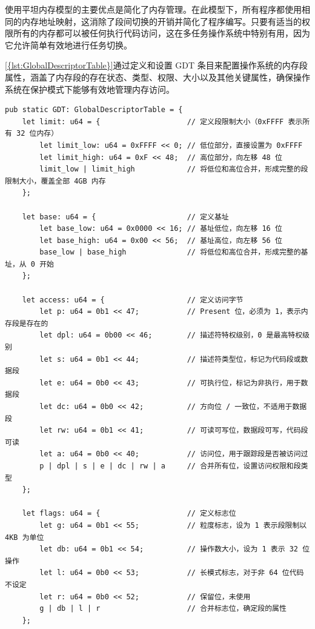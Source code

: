 使用平坦内存模型的主要优点是简化了内存管理。在此模型下，所有程序都使用相同的内存地址映射，这消除了段间切换的开销并简化了程序编写。只要有适当的权限所有的内存都可以被任何执行代码访问，这在多任务操作系统中特别有用，因为它允许简单有效地进行任务切换。

\cref{{lst:GlobalDescriptorTable}}通过定义和设置 GDT 条目来配置操作系统的内存段属性，涵盖了内存段的存在状态、类型、权限、大小以及其他关键属性，确保操作系统在保护模式下能够有效地管理内存访问。

\begin{listing}[htbp]
    \begin{verbatim}
pub static GDT: GlobalDescriptorTable = {
    let limit: u64 = {                    // 定义段限制大小（0xFFFF 表示所有 32 位内存）
        let limit_low: u64 = 0xFFFF << 0; // 低位部分，直接设置为 0xFFFF
        let limit_high: u64 = 0xF << 48;  // 高位部分，向左移 48 位
        limit_low | limit_high            // 将低位和高位合并，形成完整的段限制大小，覆盖全部 4GB 内存
    };
    
    let base: u64 = {                     // 定义基址
        let base_low: u64 = 0x0000 << 16; // 基址低位，向左移 16 位
        let base_high: u64 = 0x00 << 56;  // 基址高位，向左移 56 位
        base_low | base_high              // 将低位和高位合并，形成完整的基址，从 0 开始
    };

    let access: u64 = {                   // 定义访问字节
        let p: u64 = 0b1 << 47;           // Present 位，必须为 1，表示内存段是存在的
        let dpl: u64 = 0b00 << 46;        // 描述符特权级别，0 是最高特权级别
        let s: u64 = 0b1 << 44;           // 描述符类型位，标记为代码段或数据段
        let e: u64 = 0b0 << 43;           // 可执行位，标记为非执行，用于数据段
        let dc: u64 = 0b0 << 42;          // 方向位 / 一致位，不适用于数据段
        let rw: u64 = 0b1 << 41;          // 可读可写位，数据段可写，代码段可读
        let a: u64 = 0b0 << 40;           // 访问位，用于跟踪段是否被访问过
        p | dpl | s | e | dc | rw | a     // 合并所有位，设置访问权限和段类型
    };

    let flags: u64 = {                    // 定义标志位
        let g: u64 = 0b1 << 55;           // 粒度标志，设为 1 表示段限制以 4KB 为单位
        let db: u64 = 0b1 << 54;          // 操作数大小，设为 1 表示 32 位操作
        let l: u64 = 0b0 << 53;           // 长模式标志，对于非 64 位代码不设定
        let r: u64 = 0b0 << 52;           // 保留位，未使用
        g | db | l | r                    // 合并标志位，确定段的属性
    };


\end{verbatim}
\end{listing}
